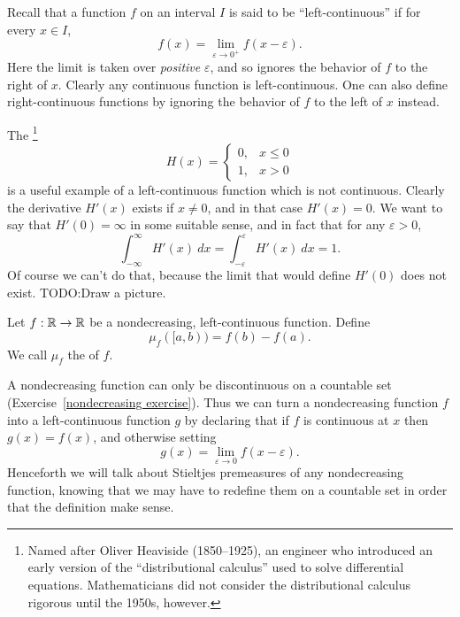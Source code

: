 \begin{subsec}
Recall that a function $f$ on an interval $I$ is said to be ``left-continuous'' if for every $x \in I$,
\[f(x) = \lim_{\varepsilon \to 0^+} f(x - \varepsilon).\]
Here the limit is taken over \emph{positive} $\varepsilon$, and so ignores the behavior of $f$ to the right of $x$.
Clearly any continuous function is left-continuous.
One can also define right-continuous functions by ignoring the behavior of $f$ to the left of $x$ instead.
\end{subsec}

\begin{example}
The \footnote{Named after Oliver Heaviside (1850--1925), an engineer who introduced an early version of the ``distributional calculus'' used to solve differential equations. Mathematicians did not consider the distributional calculus rigorous until the 1950s, however.}
\[H(x) = \begin{cases}
0, & x \leq 0\\
1, & x > 0
\end{cases}\]
is a useful example of a left-continuous function which is not continuous.
Clearly the derivative $H'(x)$ exists if $x \neq 0$, and in that case $H'(x) = 0$.
We want to say that $H'(0) = \infty$ in some suitable sense, and in fact that for any $\varepsilon > 0$,
\[\int_{-\infty}^{\infty} H'(x)~dx = \int_{-\varepsilon}^{\varepsilon} H'(x)~dx = 1.\]
Of course we can't do that, because the limit that would define $H'(0)$ does not exist.
TODO:\@ Draw a picture.
\end{example}

\begin{definition}
Let $f: \mathbb{R} \to \mathbb{R}$ be a nondecreasing, left-continuous function.
Define
\[\mu_{f}([a, b)) = f(b) - f(a).\]
We call $\mu_{f}$ the  of $f$.
\end{definition}

\begin{subsec}
A nondecreasing function can only be discontinuous on a countable set (Exercise~\ref{nondecreasing exercise}).
Thus we can turn a nondecreasing function $f$ into a left-continuous function $g$ by declaring that if $f$ is continuous at $x$ then $g(x) = f(x)$, and otherwise setting
\[g(x) = \lim_{\varepsilon \to 0} f(x - \varepsilon).\]
Henceforth we will talk about Stieltjes premeasures of any nondecreasing function, knowing that we may have to redefine them on a countable set in order that the definition make sense.
\end{subsec}

